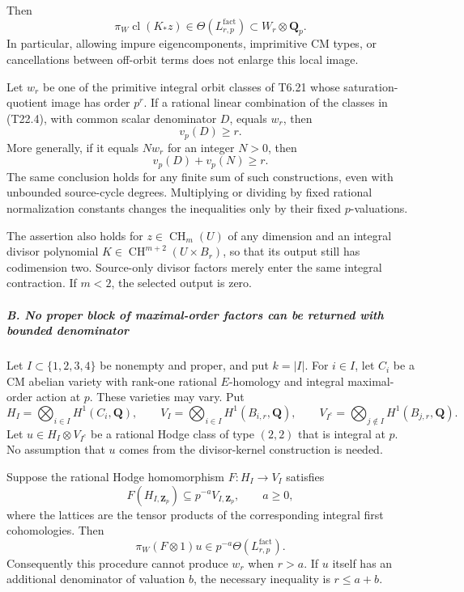Then \[
 \pi_W\operatorname{cl}(K_*z)
       \in\Theta(L^{\mathrm{fact}}_{r,p})
       \subset W_r\otimes\mathbf Q_p.
 \tag{T22.4}
\] In particular, allowing impure eigencomponents, imprimitive CM types, or cancellations between off-orbit terms does not enlarge this local image.

Let \(w_r\) be one of the primitive integral orbit classes of T6.21 whose saturation-quotient image has order \(p^r\). If a rational linear combination of the classes in (T22.4), with common scalar denominator \(D\), equals \(w_r\), then \[
 v_p(D)\ge r.
 \tag{T22.5}
\] More generally, if it equals \(Nw_r\) for an integer \(N>0\), then \[
 v_p(D)+v_p(N)\ge r.
 \tag{T22.6}
\] The same conclusion holds for any finite sum of such constructions, even with unbounded source-cycle degrees. Multiplying or dividing by fixed rational normalization constants changes the inequalities only by their fixed \(p\)-valuations.

The assertion also holds for \(z\in\operatorname{CH}_m(U)\) of any dimension and an integral divisor polynomial \(K\in\operatorname{CH}^{m+2}(U\times B_r)\), so that its output still has codimension two. Source-only divisor factors merely enter the same integral contraction. If \(m<2\), the selected output is zero.

\subparagraph{B. No proper block of maximal-order factors can be returned with bounded denominator}\label{b.-no-proper-block-of-maximal-order-factors-can-be-returned-with-bounded-denominator}

Let \(I\subset\{1,2,3,4\}\) be nonempty and proper, and put \(k=|I|\). For \(i\in I\), let \(C_i\) be a CM abelian variety with rank-one rational \(E\)-homology and integral maximal-order action at \(p\). These varieties may vary. Put \[
 H_I=\bigotimes_{i\in I}H^1(C_i,\mathbf Q),\qquad
 V_I=\bigotimes_{i\in I}H^1(B_{i,r},\mathbf Q),\qquad
 V_{I^c}=\bigotimes_{j\notin I}H^1(B_{j,r},\mathbf Q).
 \tag{T22.7}
\] Let \(u\in H_I\otimes V_{I^c}\) be a rational Hodge class of type \((2,2)\) that is integral at \(p\). No assumption that \(u\) comes from the divisor-kernel construction is needed.

Suppose the rational Hodge homomorphism \(F:H_I\to V_I\) satisfies \[
 F(H_{I,\mathbf Z_p})\subseteq p^{-a}V_{I,\mathbf Z_p},
 \qquad a\ge0,
 \tag{T22.8}
\] where the lattices are the tensor products of the corresponding integral first cohomologies. Then \[
 \pi_W(F\otimes1)u
       \in p^{-a}\Theta(L^{\mathrm{fact}}_{r,p}).
 \tag{T22.9}
\] Consequently this procedure cannot produce \(w_r\) when \(r>a\). If \(u\) itself has an additional denominator of valuation \(b\), the necessary inequality is \(r\le a+b\).

